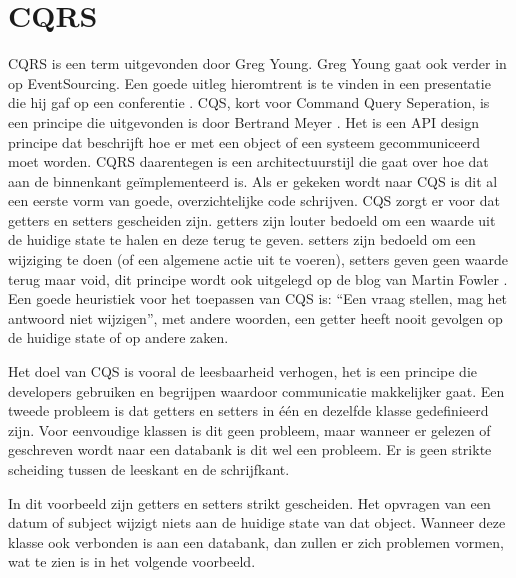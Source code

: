 
\chapter{CQRS}
\label{ch:CQRS}

\gls{CQRS} is een term uitgevonden door Greg Young. Greg Young gaat ook verder in op EventSourcing. Een goede uitleg hieromtrent is te vinden in een presentatie die hij gaf op een conferentie \autocite{Young2014CQRSandES}. \gls{CQS}, kort voor Command Query Seperation, is een principe die uitgevonden is door Bertrand Meyer \autocite{Meyer1988}. Het is een API design principe dat beschrijft hoe er met een object of een systeem gecommuniceerd moet worden. CQRS daarentegen is een architectuurstijl die gaat over hoe dat aan de binnenkant geïmplementeerd is. Als er gekeken wordt naar \gls{CQS} is dit al een eerste vorm van goede, overzichtelijke code schrijven. \gls{CQS} zorgt er voor dat \glspl{getter} en \glspl{setter} gescheiden zijn. \Glspl{getter} zijn louter bedoeld om een waarde uit de huidige state te halen en deze terug te geven. \Glspl{setter} zijn bedoeld om een wijziging te doen (of een algemene actie uit te voeren), \glspl{setter} geven geen waarde terug maar \gls{void}, dit principe wordt ook uitgelegd op de blog van Martin Fowler \autocite{Fowler2005CQS}. Een goede heuristiek voor het toepassen van \gls{CQS} is: ``Een vraag stellen, mag het antwoord niet wijzigen'', met andere woorden, een \gls{getter} heeft nooit gevolgen op de huidige state of op andere zaken.

Het doel van \gls{CQS} is vooral de leesbaarheid verhogen, het is een principe die developers gebruiken en begrijpen waardoor communicatie makkelijker gaat.
Een tweede probleem is dat \glspl{getter} en \glspl{setter} in één en dezelfde klasse gedefinieerd zijn. Voor eenvoudige klassen is dit geen probleem, maar wanneer er gelezen of geschreven wordt naar een databank is dit wel een probleem. Er is geen strikte scheiding tussen de leeskant en de schrijfkant.


In dit voorbeeld zijn \glspl{getter} en \glspl{setter} strikt gescheiden. Het opvragen van een datum of subject wijzigt niets aan de huidige state van dat object. Wanneer deze klasse ook verbonden is aan een databank, dan zullen er zich problemen vormen, wat te zien is in het volgende voorbeeld.

